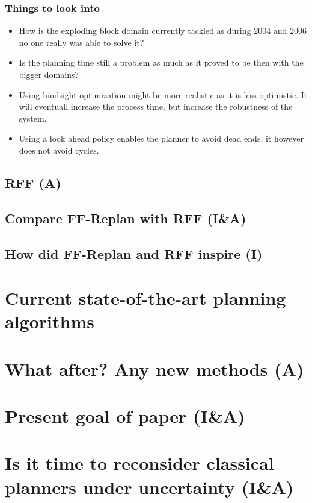 \documentclass[runningheads,a4paper]{llncs}
\begin{document}
\subsubsection{Things to look into}
\begin{itemize}
	\item How is the exploding block domain currently tackled as during 2004 and 2006 no one really was able to solve it?
	\item Is the planning time still a problem as much as it proved to be then with the bigger domains?
	\item Using hindsight optimization might be more realistic as it is less optimistic. It will eventuall increase the process time, but increase the robustness of the system. 
	\item Using a look ahead policy enables the planner to avoid dead ends, it however does not avoid cycles.
\end{itemize}

\subsection{RFF (A)}

\subsection{Compare FF-Replan with RFF (I\&A)}

\subsection{How did FF-Replan and RFF inspire (I)}

\section{Current state-of-the-art planning algorithms}

\section{What after? Any new methods (A)}

\section{Present goal of paper (I\&A)}

\section{Is it time to reconsider classical planners under uncertainty (I\&A)}



\end{document}

